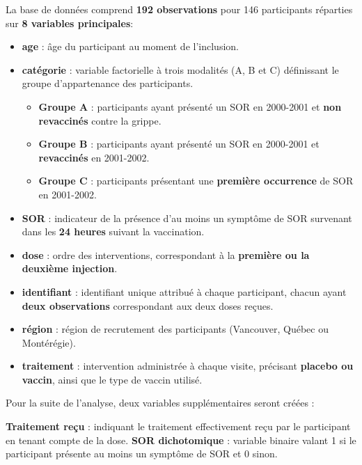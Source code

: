 \documentclass[
]{article}
\providecommand{\tightlist}{%
  \setlength{\itemsep}{0pt}\setlength{\parskip}{0pt}}
\begin{document}
La base de données comprend \textbf{192 observations} pour 146
participants réparties sur \textbf{8 variables principales}:

\begin{itemize}
\tightlist
\item
  \textbf{age} : âge du participant au moment de l'inclusion.\\
\item
  \textbf{catégorie} : variable factorielle à trois modalités (A, B et
  C) définissant le groupe d'appartenance des participants.

  \begin{itemize}
  \tightlist
  \item
    \textbf{Groupe A} : participants ayant présenté un SOR en 2000-2001
    et \textbf{non revaccinés} contre la grippe.\\
  \item
    \textbf{Groupe B} : participants ayant présenté un SOR en 2000-2001
    et \textbf{revaccinés} en 2001-2002.\\
  \item
    \textbf{Groupe C} : participants présentant une \textbf{première
    occurrence} de SOR en 2001-2002.\\
  \end{itemize}
\item
  \textbf{SOR} : indicateur de la présence d'au moins un symptôme de SOR
  survenant dans les \textbf{24 heures} suivant la vaccination.\\
\item
  \textbf{dose} : ordre des interventions, correspondant à la
  \textbf{première ou la deuxième injection}.\\
\item
  \textbf{identifiant} : identifiant unique attribué à chaque
  participant, chacun ayant \textbf{deux observations} correspondant aux
  deux doses reçues.\\
\item
  \textbf{région} : région de recrutement des participants (Vancouver,
  Québec ou Montérégie).\\
\item
  \textbf{traitement} : intervention administrée à chaque visite,
  précisant \textbf{placebo ou vaccin}, ainsi que le type de vaccin
  utilisé.
\end{itemize}

Pour la suite de l'analyse, deux variables supplémentaires seront créées
:

\textbf{Traitement reçu} : indiquant le traitement effectivement reçu
par le participant en tenant compte de la dose. \textbf{SOR
dichotomique} : variable binaire valant 1 si le participant présente au
moins un symptôme de SOR et 0 sinon.
\end{document}
